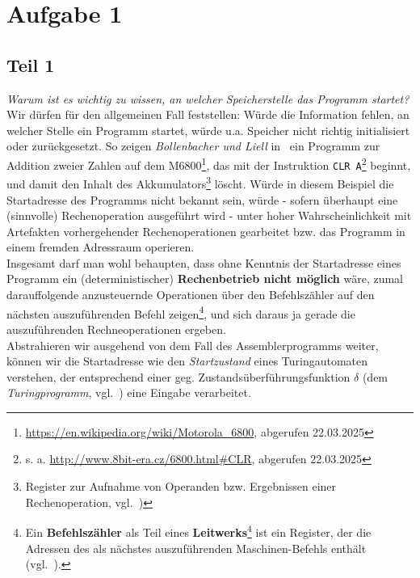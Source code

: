 \chapter{Aufgabe 1}

\section{Teil 1}

\textit{Warum ist es wichtig zu wissen, an welcher Speicherstelle das Programm startet?}\\

\noindent
Wir dürfen für den allgemeinen Fall feststellen: Würde die Information fehlen, an welcher Stelle ein Programm startet,  würde u.a. Speicher nicht richtig initialisiert oder zurückgesetzt. So zeigen \textit{Bollenbacher und Liell} in~\cite[\textbf{Tabelle 19}, 86]{BL22} ein Programm zur Addition zweier Zahlen auf dem M6800\footnote{
\url{https://en.wikipedia.org/wiki/Motorola_6800}, abgerufen 22.03.2025
}, das mit der Instruktion \texttt{CLR A}\footnote{
s. a. \url{http://www.8bit-era.cz/6800.html#CLR}, abgerufen 22.03.2025
} beginnt, und damit den Inhalt des  Akkumulators\footnote{
Register zur Aufnahme von Operanden bzw. Ergebnissen einer Rechenoperation, vgl.~\cite[233]{Fri21})
} löscht.
Würde in diesem Beispiel die Startadresse des Programms nicht bekannt sein, würde - sofern überhaupt eine (sinnvolle) Rechenoperation ausgeführt wird - unter hoher Wahrscheinlichkeit mit Artefakten vorhergehender Rechenoperationen gearbeitet bzw. das Programm in einem fremden Adressraum operieren.\\

\noindent
Insgesamt darf man wohl behaupten, dass ohne Kenntnis der Startadresse eines Programm ein (deterministischer) \textbf{Rechenbetrieb nicht möglich} wäre, zumal darauffolgende anzusteuernde Operationen über den Befehlszähler auf den nächsten auszuführenden Befehl zeigen\footnote{
Ein \textbf{Befehlszähler} als Teil eines \textbf{Leitwerks}\footnote{
    hier insb. bei der Von-Neumann-Rechnerarchitektur
} ist ein Register, der die Adressen des als nächstes auszuführenden Maschinen-Befehls enthält (vgl.~\cite[234]{Fri21}).
}, und sich daraus ja gerade die auszuführenden Rechneoperationen ergeben.\\

\noindent
Abstrahieren wir ausgehend von dem Fall des Assemblerprogramms weiter, können wir die Startadresse wie den \textit{Startzustand} eines Turingautomaten verstehen, der entsprechend einer geg. Zustandsüberführungsfunktion $\delta$ (dem \textit{Turingprogramm}, vgl.~\cite[269 f.]{VW16h}) eine Eingabe verarbeitet.

